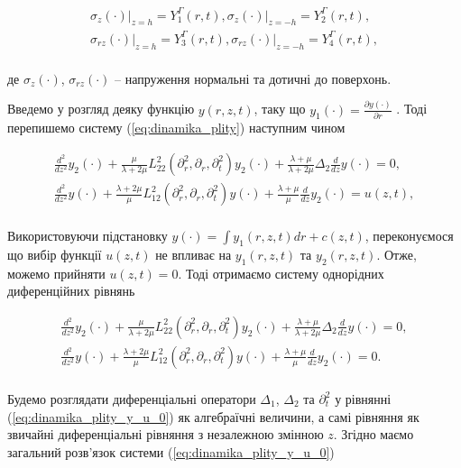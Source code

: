 \begin{gather*}
\sigma_z(\cdot)\bigg|_{z=h} = Y_1^\Gamma(r, t), \sigma_z(\cdot)\bigg|_{z=-h} = Y_2^\Gamma(r, t), \\
\sigma_{rz}(\cdot)\bigg|_{z=h} = Y_3^\Gamma(r, t), \sigma_{rz}(\cdot)\bigg|_{z=-h} = Y_4^\Gamma(r, t), \\
\end{gather*}

де $\sigma_z(\cdot)$, $\sigma_{rz}(\cdot)$ – напруження нормальні та дотичні до поверхонь.

Введемо у розгляд деяку функцію $y(r,z,t)$, таку що $y_1(\cdot) = \frac{\partial y(\cdot)}{\partial r}$ .
Тоді перепишемо систему  (\ref{eq:dinamika_plity}) наступним чином

\begin{equation}
\label{eq:dinamika_plity_y}
\begin{multlined}
\frac{d^2}{dz^2}y_2(\cdot) + \frac{\mu}{\lambda + 2\mu}L_{22}^2(\partial_r^2, \partial_r, \partial_t^2)y_2(\cdot)+
\frac{\lambda + \mu}{\lambda + 2\mu} \Delta_2 \frac{d}{dz}y(\cdot) = 0, \\
\frac{d^2}{dz^2}y(\cdot) + \frac{\lambda + 2\mu}{\mu}L_{12}^2(\partial_r^2, \partial_r, \partial_t^2)y(\cdot)+
\frac{\lambda + \mu}{\mu}\frac{d}{dz}y_2(\cdot) = u(z, t), \\
\end{multlined}
\end{equation}

Використовуючи підстановку $y(\cdot) = \int y_1(r,z,t)dr + c(z, t)$, переконуємося що вибір функції
$u(z, t)$ не впливає на $y_1(r,z,t)$ та $y_2(r,z,t)$.
Отже, можемо прийняти $u(z, t)=0$. Тоді отримаємо систему однорідних диференційних рівнянь

\begin{equation}
\label{eq:dinamika_plity_y_u_0}
\begin{multlined}
\frac{d^2}{dz^2}y_2(\cdot) + \frac{\mu}{\lambda + 2\mu}L_{22}^2(\partial_r^2, \partial_r, \partial_t^2)y_2(\cdot)+
\frac{\lambda + \mu}{\lambda + 2\mu} \Delta_2 \frac{d}{dz}y(\cdot) = 0, \\
\frac{d^2}{dz^2}y(\cdot) + \frac{\lambda + 2\mu}{\mu}L_{12}^2(\partial_r^2, \partial_r, \partial_t^2)y(\cdot)+
\frac{\lambda + \mu}{\mu}\frac{d}{dz}y_2(\cdot) = 0. \\
\end{multlined}
\end{equation}



Будемо розглядати диференціальні оператори $\Delta_1$, $\Delta_2$ та $\partial_t^2$
у рівнянні (\ref{eq:dinamika_plity_y_u_0}) як алгебраїчні величини, а
самі рівняння як звичайні диференціальні рівняння з незалежною змінною $z$. Згідно \cite{Skopetskiy-Matematychne}
маємо загальний розв’язок системи (\ref{eq:dinamika_plity_y_u_0})

